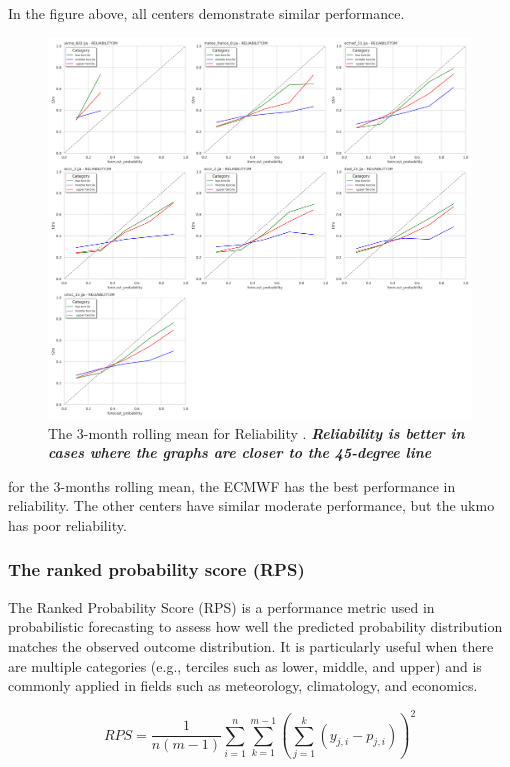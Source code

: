 In the figure above, all centers demonstrate similar performance.

\begin{figure}[H]
\centering
\includegraphics[scale=0.3]{rela_graphe.png}
\caption{The 3-month rolling mean for Reliability   . \textbf{\textit{Reliability is better in cases where the graphs are closer to the 45-degree line}}}
\end{figure}
for the 3-months rolling mean, the ECMWF has the best performance in reliability. The other centers have similar moderate performance, but the ukmo has poor reliability.







\subsubsection{The ranked probability score (RPS)}

The Ranked Probability Score (RPS) is a performance metric used in probabilistic forecasting to assess how well the predicted probability distribution matches the observed outcome distribution. It is particularly useful when there are multiple categories (e.g., terciles such as lower, middle, and upper) and is commonly applied in fields such as meteorology, climatology, and economics.

$$RPS=\frac{1}{n(m-1)}\sum\limits_{i=1}^{n} \sum\limits_{k=1}^{m-1} \left(\sum\limits_{j=1}^{k}(y_{j,i} - p_{j,i})\right)^2  $$

